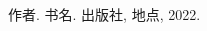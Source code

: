 
\begin{thebibliography}{9}%
    
    作者.
    \newblock 书名.
    \newblock 出版社, 地点, 2022.


\end{thebibliography}
